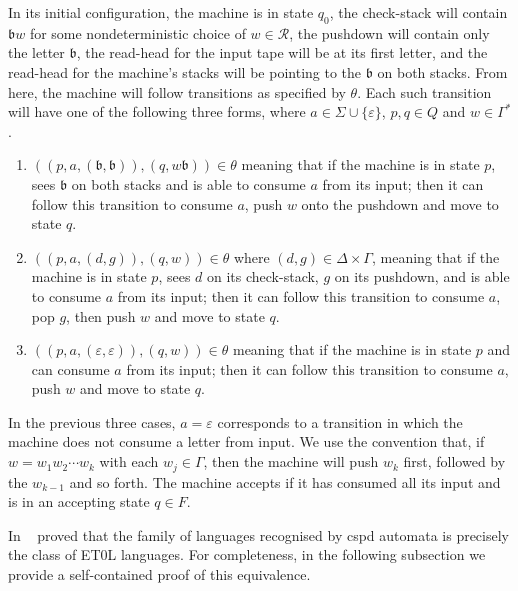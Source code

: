 In its initial configuration, the machine is in state $q_0$, the check-stack will contain $\mathfrak{b}w$ for some nondeterministic choice of $w \in \mathcal{R}$, the pushdown will contain only the letter $\mathfrak{b}$, the read-head for the input tape will be at its first letter, and the read-head for the machine's stacks will be pointing to the $\mathfrak{b}$ on both stacks.
From here, the machine will follow transitions as specified by $\theta$.
Each such transition will have one of the following three forms, where $a\in \Sigma\cup\{\varepsilon\}$, $p,q\in Q$ and $w \in \Gamma^*$.

\begin{enumerate}
	
	\item
	$((p,a,(\mathfrak{b},\mathfrak{b})),(q, w\mathfrak{b})) \in \theta$ meaning that if the machine is in state $p$, sees $\mathfrak{b}$ on both stacks and is able to consume $a$ from its input;
	then it can follow this transition to  consume $a$, push $w$ onto the pushdown and move to state $q$.
	
	\item
	$((p,a,(d,g)),(q,w)) \in \theta$ where $ (d,g) \in \Delta \times \Gamma$,
	meaning that if the machine is in state $p$, sees $d$ on its check-stack, $g$ on its pushdown, and is able to consume $a$ from its input;
	then it can follow this transition to  consume $a$, pop $g$, then push $w$ and move to state $q$.
	
	\item
	$((p,a,(\varepsilon,\varepsilon)),(q,w)) \in \theta$
	meaning that if the machine is in state $p$ and can consume $a$ from its input;
	then it can follow this transition to  consume $a$, push $w$ and move to state $q$.
\end{enumerate}

In the previous three cases, $a = \varepsilon$ corresponds to a transition in which the machine does not consume a letter from input.
We use the convention that, if $w = w_1 w_2 \cdots w_k$ with each $w_j \in \Gamma$, then the machine will push $w_k$ first, followed by the $w_{k-1}$ and so forth. 
The machine accepts if it has consumed all its input and is in an accepting state $q \in F$.

In \cite{leeuwen1976}~\citeauthor{leeuwen1976} proved that the family of languages recognised by cspd automata is precisely the class of ET0L languages. 
For completeness, in the following subsection we provide a self-contained proof of this equivalence.

